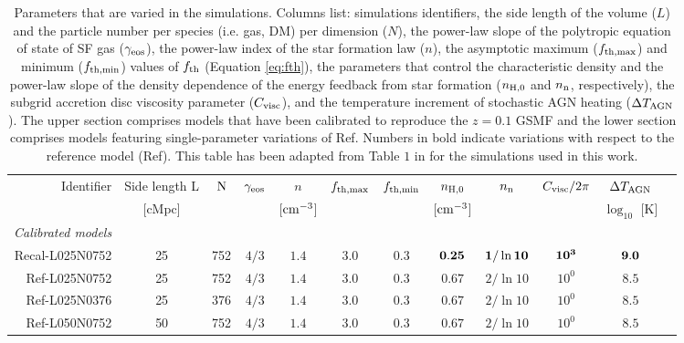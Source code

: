 \documentclass[useAMS,usenatbib]{mn2e}
\begin{document}
\begin{table*} 
\begin{center}
\caption{Parameters that are varied in the simulations. Columns list: simulations identifiers, the side length of the volume ($L$) and the particle number per species (i.e. gas, DM) per dimension ($N$), 
the power-law slope of the polytropic equation of state of SF gas ($\gamma_{\rm eos}$), 
the power-law index of the star formation law ($n$), 
the asymptotic maximum ($f_{\rm th,max}$) and minimum ($f_{\rm th,min}$) values of $f_{\rm th}$ (Equation \ref{eq:fth}), 
the parameters that control the characteristic density and the power-law slope of the density dependence 
of the energy feedback from star formation ($n_{\rm H,0}$ and $n_{\rm n}$, respectively), the subgrid accretion disc viscosity parameter ($C_{\rm visc}$), and the temperature increment of stochastic AGN heating ($\Delta T_{\rm AGN}$). The upper section comprises models that have been calibrated to reproduce the $z = 0.1$ GSMF and the lower section comprises models featuring single-parameter variations of Ref. Numbers in bold indicate variations with respect to the reference model (Ref). 
This table has been adapted from Table $1$ in \citet{crain2015} for the simulations used in
this work.}
\begin{tabular}{r c c c c c c c c c c c}
\hline
\hline
Identifier & Side length L & ${\rm N}$ & $\gamma_{\rm eos}$ & $n$               & $f_{\rm th,max}$ & $f_{\rm th,min}$ & $n_{\rm H,0}$     & $n_{\rm n}$ & $C_{\rm visc}/2\pi$ & $\Delta T_{\rm AGN}$  \\
           & [cMpc]      &     &                    & [${\rm cm}^{-3}$] &                  &                  & [${\rm cm}^{-3}$] &             &                     & $\log_{10}$ [K]       \\
\hline
\textit{Calibrated models} \\
Recal-L025N0752     & 25  & 752   & $4/3$      & $1.4$     & $3.0$      & $0.3$       & $\bf 0.25$  & $\bf 1/\ln{10}$ & $\bf 10^3$ & $\bf 9.0$ \\
Ref-L025N0752       & 25  & 752   & $4/3$      & $1.4$     & $3.0$      & $0.3$       & $0.67$      & $2/\ln{10}$     & $10^0$     & $8.5$ \\
Ref-L025N0376       & 25  & 376   & $4/3$      & $1.4$     & $3.0$      & $0.3$       & $0.67$      & $2/\ln{10}$     & $10^0$     & $8.5$ \\
Ref-L050N0752       & 50  & 752   & $4/3$      & $1.4$     & $3.0$      & $0.3$       & $0.67$      & $2/\ln{10}$     & $10^0$     & $8.5$ \\

\end{tabular}
\end{center}
\end{table*}
\end{document}
